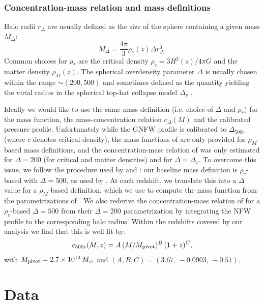 \documentclass[useAMS,usenatbib]{mn2e}
\begin{document}
    \subsubsection{Concentration-mass relation and mass definitions}\label{sssec:theory.hm.cm}
      Halo radii $r_\Delta$ are usually defined as the size of the sphere containing a given mass $M_\Delta$:
      \begin{equation}
        M_\Delta = \frac{4\pi}{3}\rho_*(z)\Delta r^3_\Delta.
      \end{equation}
      Common choices for $\rho_*$ are the critical density $\rho_c=3H^2(z)/4\pi G$ and the matter density $\rho_M(z)$. The spherical overdensity parameter $\Delta$ is usually chosen within the range $\sim(200,500)$ and sometimes defined as the quantity yielding the virial radius in the spherical top-hat collapse model $\Delta_v$ \citep{1998ApJ...495...80B}.

      Ideally we would like to use the same mass definition (i.e. choice of $\Delta$ and $\rho_*$) for the mass function, the mass-concentration relation $c_\Delta(M)$ and the calibrated pressure profile. Unfortunately while the GNFW profile is calibrated to $\Delta_{500c}$ (where $c$ denotes critical density), the mass functions of \cite{2008ApJ...688..709T,2010ApJ...724..878T} are only provided for $\rho_M$-based mass definitions, and the concentration-mass relation of \cite{2008MNRAS.390L..64D} was only estimated for $\Delta=200$ (for critical and matter densities) and for $\Delta=\Delta_v$. To overcome this issue, we follow the procedure used by \cite{2016A&A...594A..24P} and \cite{2018MNRAS.477.4957B}: our baseline mass definition is $\rho_c$-based with $\Delta=500$, as used by \cite{2010A&A...517A..92A}. At each redshift, we translate this into a $\Delta$ value for a $\rho_M$-based definition, which we use to compute the mass function from the parametrizations of \cite{2008ApJ...688..709T,2010ApJ...724..878T}. We also rederive the concentration-mass relation of \cite{2008MNRAS.390L..64D} for a $\rho_c$-based $\Delta=500$ from their $\Delta=200$ parametrization by integrating the NFW profile to the corresponding halo radius. Within the redshifts covered by our analysis we find that this is well fit by:
      \begin{equation}
        c_{500c}(M,z)= A\,(M/M_{\rm pivot})^B\,(1+z)^C,
      \end{equation}
      with $M_{\rm pivot}=2.7\times10^{12}\,M_\odot$ and $(A,B,C)=(3.67,\,-0.0903,\,-0.51)$.

\section{Data}\label{sec:data}
\end{document}
